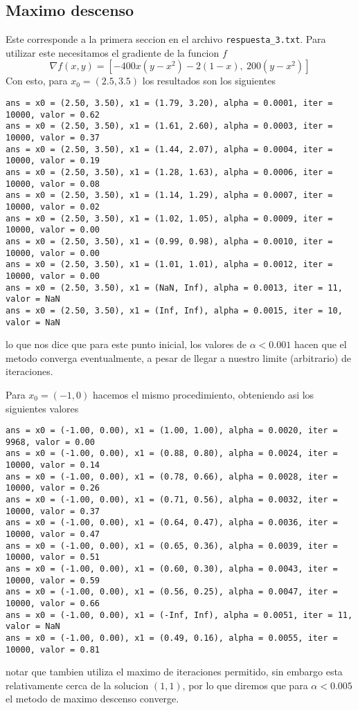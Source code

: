 \documentclass[letterpaper]{article}
\begin{document}
\subsection*{Maximo descenso}
Este corresponde a la primera seccion en el archivo
\texttt{respuesta\_3.txt}. Para utilizar este necesitamos el gradiente de
la funcion \(f\)
\[ \nabla f (x,y) = [-400 x (y - x^2) - 2 (1-x),\ 200 (y-x^2)] \]
Con esto, para \(x_0 = (2.5, 3.5)\) los resultados son los siguientes
\begin{verbatim}
ans = x0 = (2.50, 3.50), x1 = (1.79, 3.20), alpha = 0.0001, iter = 10000, valor = 0.62
ans = x0 = (2.50, 3.50), x1 = (1.61, 2.60), alpha = 0.0003, iter = 10000, valor = 0.37
ans = x0 = (2.50, 3.50), x1 = (1.44, 2.07), alpha = 0.0004, iter = 10000, valor = 0.19
ans = x0 = (2.50, 3.50), x1 = (1.28, 1.63), alpha = 0.0006, iter = 10000, valor = 0.08
ans = x0 = (2.50, 3.50), x1 = (1.14, 1.29), alpha = 0.0007, iter = 10000, valor = 0.02
ans = x0 = (2.50, 3.50), x1 = (1.02, 1.05), alpha = 0.0009, iter = 10000, valor = 0.00
ans = x0 = (2.50, 3.50), x1 = (0.99, 0.98), alpha = 0.0010, iter = 10000, valor = 0.00
ans = x0 = (2.50, 3.50), x1 = (1.01, 1.01), alpha = 0.0012, iter = 10000, valor = 0.00
ans = x0 = (2.50, 3.50), x1 = (NaN, Inf), alpha = 0.0013, iter = 11, valor = NaN
ans = x0 = (2.50, 3.50), x1 = (Inf, Inf), alpha = 0.0015, iter = 10, valor = NaN
\end{verbatim}
lo que nos dice que para este punto inicial, los valores de \(\alpha <
0.001\) hacen que el metodo converga eventualmente, a pesar de llegar a
nuestro limite (arbitrario) de iteraciones.

Para \(x_0 = (-1,0)\) hacemos el mismo procedimiento, obteniendo asi los
siguientes valores
\begin{verbatim}
ans = x0 = (-1.00, 0.00), x1 = (1.00, 1.00), alpha = 0.0020, iter = 9968, valor = 0.00
ans = x0 = (-1.00, 0.00), x1 = (0.88, 0.80), alpha = 0.0024, iter = 10000, valor = 0.14
ans = x0 = (-1.00, 0.00), x1 = (0.78, 0.66), alpha = 0.0028, iter = 10000, valor = 0.26
ans = x0 = (-1.00, 0.00), x1 = (0.71, 0.56), alpha = 0.0032, iter = 10000, valor = 0.37
ans = x0 = (-1.00, 0.00), x1 = (0.64, 0.47), alpha = 0.0036, iter = 10000, valor = 0.47
ans = x0 = (-1.00, 0.00), x1 = (0.65, 0.36), alpha = 0.0039, iter = 10000, valor = 0.51
ans = x0 = (-1.00, 0.00), x1 = (0.60, 0.30), alpha = 0.0043, iter = 10000, valor = 0.59
ans = x0 = (-1.00, 0.00), x1 = (0.56, 0.25), alpha = 0.0047, iter = 10000, valor = 0.66
ans = x0 = (-1.00, 0.00), x1 = (-Inf, Inf), alpha = 0.0051, iter = 11, valor = NaN
ans = x0 = (-1.00, 0.00), x1 = (0.49, 0.16), alpha = 0.0055, iter = 10000, valor = 0.81
\end{verbatim}
notar que tambien utiliza el maximo de iteraciones permitido, sin embargo
esta relativamente cerca de la solucion \((1,1)\), por lo que diremos que
para \(\alpha < 0.005\) el metodo de maximo descenso converge.
\end{document}
